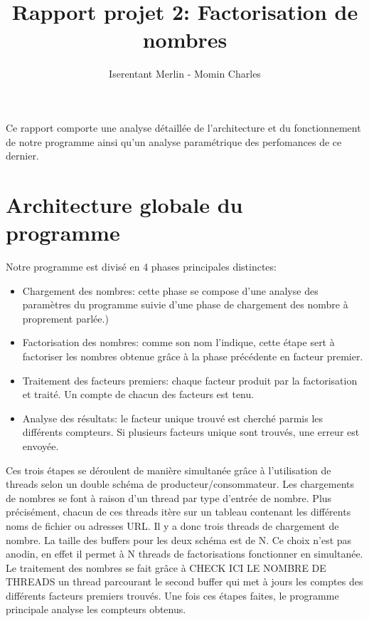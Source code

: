\documentclass[11pt,a4paper]{article}
\begin{document}
\author{Iserentant Merlin - Momin Charles}
\title{Rapport projet 2: Factorisation de nombres}
\maketitle

Ce rapport comporte une analyse détaillée de l'architecture et du fonctionnement de notre programme ainsi qu'un analyse paramétrique des perfomances de ce dernier. 

\section{Architecture globale du programme}
Notre programme est divisé en 4 phases principales distinctes:

\begin{itemize}
\item{Chargement des nombres: cette phase se compose d'une analyse des paramètres du programme suivie d'une phase de chargement des nombre à proprement parlée.)}
\item{Factorisation des nombres: comme son nom l'indique, cette étape sert à factoriser les nombres obtenue grâce à la phase précédente en facteur premier.}
\item{Traitement des facteurs premiers: chaque facteur produit par la factorisation et traité. Un compte de chacun des facteurs est tenu.}
\item{Analyse des résultats: le facteur unique trouvé est cherché parmis les différents compteurs. Si plusieurs facteurs unique sont trouvés, une erreur est envoyée.}
\end{itemize}

Ces trois étapes se déroulent de manière simultanée grâce à l'utilisation de threads selon un double schéma de producteur/consommateur. Les chargements de nombres se font à raison d'un thread par type d'entrée de nombre. Plus précisément, chacun de ces threads itère sur un tableau contenant les différents noms de fichier ou adresses URL. Il y a donc trois threads de chargement de nombre.  La taille des buffers pour les deux schéma est de N. Ce choix n'est pas anodin, en effet il permet à N threads de factorisations fonctionner en simultanée. Le traitement des nombres se fait grâce à CHECK ICI LE NOMBRE DE THREADS un thread parcourant le second buffer qui met à jours les comptes des différents facteurs premiers trouvés.
Une fois ces étapes faites, le programme principale analyse les compteurs obtenus.
\end{document}
